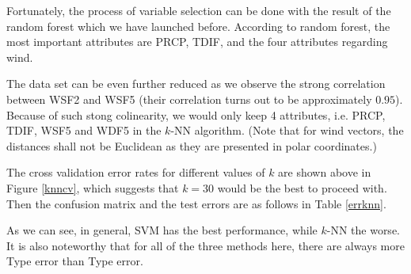 Fortunately, the process of variable selection can be done with the result of the random forest which we have launched before. According to random forest, the most important attributes are PRCP, TDIF, and the four attributes regarding wind.

The data set can be even further reduced as we observe the strong correlation between WSF2 and WSF5 (their correlation turns out to be approximately $0.95$). Because of such stong colinearity, we would only keep 4 attributes, i.e. PRCP, TDIF, WSF5 and WDF5 in the $k$-NN algorithm. (Note that for wind vectors, the distances shall not be Euclidean as they are presented in polar coordinates.)

The cross validation error rates for different values of $k$ are shown above in Figure \ref{knncv}, which suggests that $k=30$ would be the best to proceed with. Then the confusion matrix and the test errors are as follows in Table \ref{errknn}.

As we can see, in general, SVM has the best performance, while $k$-NN the worse. It is also noteworthy that for all of the three methods here, there are always more Type \uppercase\expandafter{} error than Type \uppercase\expandafter{} error.

